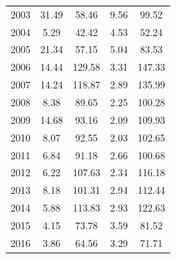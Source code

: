 \documentclass[12pt,]{article}
\begin{document}
\begin{longtable}{ccccc}
  2003 & 31.49 & 58.46 & 9.56 & 99.52 \\ 
  2004 & 5.29 & 42.42 & 4.53 & 52.24 \\ 
  2005 & 21.34 & 57.15 & 5.04 & 83.53 \\ 
  2006 & 14.44 & 129.58 & 3.31 & 147.33 \\ 
  2007 & 14.24 & 118.87 & 2.89 & 135.99 \\ 
  2008 & 8.38 & 89.65 & 2.25 & 100.28 \\ 
  2009 & 14.68 & 93.16 & 2.09 & 109.93 \\ 
  2010 & 8.07 & 92.55 & 2.03 & 102.65 \\ 
  2011 & 6.84 & 91.18 & 2.66 & 100.68 \\ 
  2012 & 6.22 & 107.63 & 2.34 & 116.18 \\ 
  2013 & 8.18 & 101.31 & 2.94 & 112.44 \\ 
  2014 & 5.88 & 113.83 & 2.93 & 122.63 \\ 
  2015 & 4.15 & 73.78 & 3.59 & 81.52 \\ 
  2016 & 3.86 & 64.56 & 3.29 & 71.71 \\ 
   \hline
\hline
\end{longtable}

\newpage

\FloatBarrier
\end{document}

